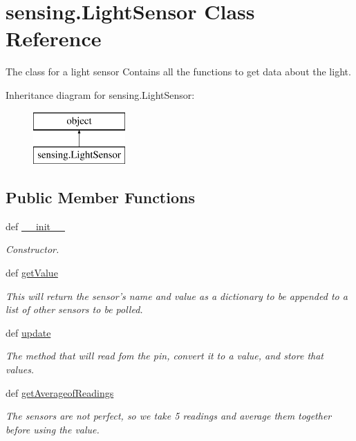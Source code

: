 \hypertarget{classsensing_1_1_light_sensor}{\section{sensing.\-Light\-Sensor Class Reference}
\label{classsensing_1_1_light_sensor}
}


The class for a light sensor Contains all the functions to get data about the light.  


Inheritance diagram for sensing.\-Light\-Sensor\-:\begin{figure}[H]
\begin{center}
\leavevmode
\includegraphics[height=2.000000cm]{classsensing_1_1_light_sensor}
\end{center}
\end{figure}
\subsection*{Public Member Functions}
\begin{DoxyCompactItemize}
\item 
def \hyperlink{classsensing_1_1_light_sensor_a906bcf76dc955878006f8f72dc9e3105}{\-\_\-\-\_\-init\-\_\-\-\_\-}
\begin{DoxyCompactList}\small\item\em Constructor. \end{DoxyCompactList}\item 
def \hyperlink{classsensing_1_1_light_sensor_aab3cbdaa280ccafb57e62e918940cb89}{get\-Value}
\begin{DoxyCompactList}\small\item\em This will return the sensor's name and value as a dictionary to be appended to a list of other sensors to be polled. \end{DoxyCompactList}\item 
def \hyperlink{classsensing_1_1_light_sensor_add45ebed39d38396dff214a90c6d814a}{update}
\begin{DoxyCompactList}\small\item\em The method that will read fom the pin, convert it to a value, and store that values. \end{DoxyCompactList}\item 
def \hyperlink{classsensing_1_1_light_sensor_aaf57806c085727f8ec922b5baa5c1f3b}{get\-Averageof\-Readings}
\begin{DoxyCompactList}\small\item\em The sensors are not perfect, so we take 5 readings and average them together before using the value. \end{DoxyCompactList}\end{DoxyCompactItemize}


